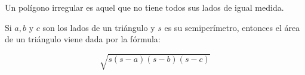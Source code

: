 \begin{definition}
    Un polígono irregular es aquel que no tiene todos sus lados de igual medida.
\end{definition}

\begin{theorem}

Si $a,b$ y $c$ son los lados de un triángulo y $s$ es su semiperímetro, entonces el área de un triángulo viene dada por la fórmula:

$$\sqrt{s(s-a)(s-b)(s-c)}$$
    
\end{theorem}

\nocite{MGECED05}
\printbibliography[heading=subbibliography,title={Bibliografía}]